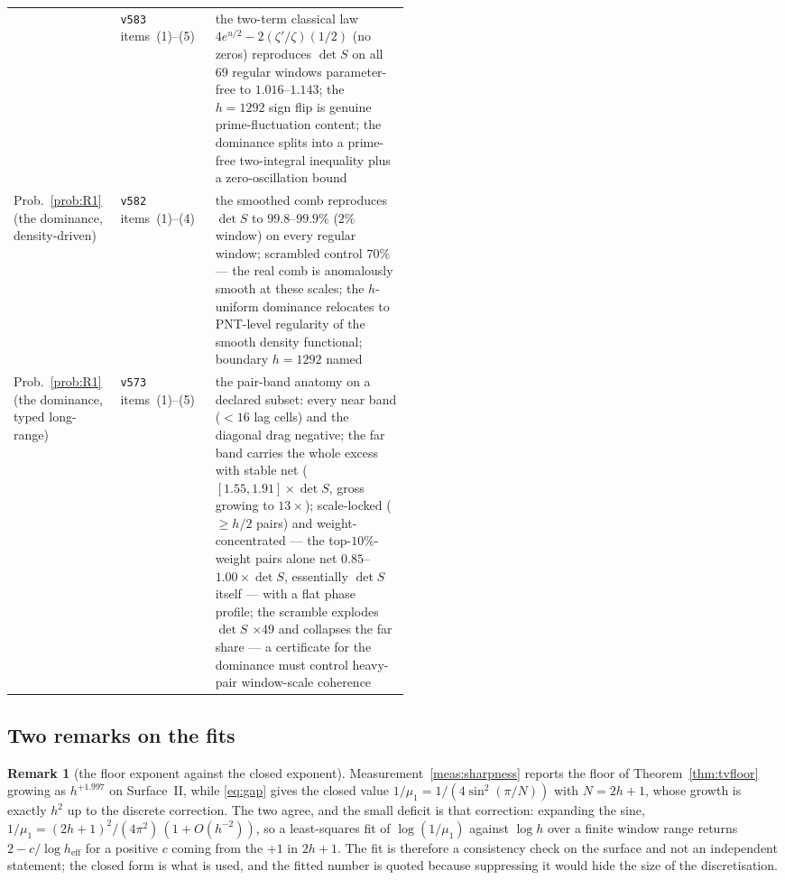 \documentclass[11pt,a4paper]{article}
\theoremstyle{plain}
\theoremstyle{definition}
\newtheorem{remark}[theorem]{Remark}
\begin{document}
{\begin{xltabular}{\textwidth}{@{}p{0.27\linewidth}p{0.24\linewidth}Y@{}}
  & \texttt{v583} items~(1)--(5)
  & the two-term classical law $4e^{u/2}-2(\zeta'/\zeta)(1/2)$ (no
    zeros) reproduces $\det S$ on all $69$ regular windows
    parameter-free to $1.016$--$1.143$; the $h=1292$ sign flip is
    genuine prime-fluctuation content; the dominance splits into a
    prime-free two-integral inequality plus a zero-oscillation bound \\
Prob.~\ref{prob:R1} (the dominance, density-driven)
  & \texttt{v582} items~(1)--(4)
  & the smoothed comb reproduces $\det S$ to $99.8$--$99.9\%$ ($2\%$
    window) on every regular window; scrambled control $70\%$ --- the
    real comb is anomalously smooth at these scales; the $h$-uniform
    dominance relocates to PNT-level regularity of the smooth density
    functional; boundary $h=1292$ named \\
Prob.~\ref{prob:R1} (the dominance, typed long-range)
  & \texttt{v573} items~(1)--(5)
  & the pair-band anatomy on a declared subset: every near band
    ($<16$ lag cells) and the diagonal drag negative; the far band
    carries the whole excess with stable net ($[1.55,1.91]\times\det S$,
    gross growing to $13\times$); scale-locked ($\ge h/2$ pairs) and
    weight-concentrated --- the top-$10\%$-weight pairs alone net
    $0.85$--$1.00\times\det S$, essentially $\det S$ itself --- with a
    flat phase profile; the scramble explodes $\det S$
    $\times49$ and collapses the far share --- a certificate for the
    dominance must control heavy-pair window-scale coherence \\
\end{xltabular}}

\subsection{Two remarks on the fits}
\label{sec:fits}

\begin{remark}[the floor exponent against the closed exponent]
\label{rem:fit2}
Measurement~\ref{meas:sharpness} reports the floor of
Theorem~\ref{thm:tvfloor} growing as $h^{+1.997}$ on Surface~II, while
\eqref{eq:gap} gives the closed value $1/\mu_1=1/(4\sin^{2}(\pi/N))$ with
$N=2h+1$, whose growth is exactly $h^{2}$ up to the discrete correction. The
two agree, and the small deficit is that correction: expanding the sine,
$1/\mu_1=(2h+1)^{2}/(4\pi^{2})\,(1+O(h^{-2}))$, so a least-squares fit of
$\log(1/\mu_1)$ against $\log h$ over a finite window range returns
$2-c/\log h_{\mathrm{eff}}$ for a positive $c$ coming from the $+1$ in $2h+1$.
The fit is therefore a consistency check on the surface and not an independent
statement; the closed form is what is used, and the fitted number is quoted
because suppressing it would hide the size of the discretisation.
\end{remark}
\end{document}
